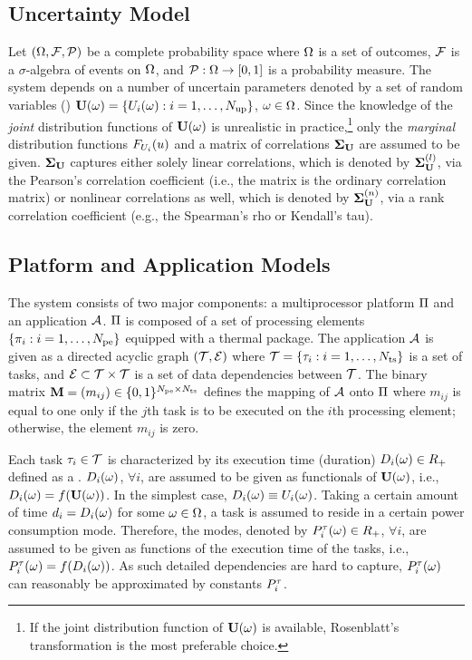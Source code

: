 \subsection{Uncertainty Model} 
Let $(\Omega, \mathcal{F}, \mathcal{P})$ be a complete probability space where $\Omega$ is a set of outcomes, $\mathcal{F}$ is a $\sigma$-algebra of events on $\Omega$, and $\mathcal{P}: \Omega \to [0, 1]$ is a probability measure. The system depends on a number of uncertain parameters denoted by a set of random variables (\rvs) $\mathbf{U}(\omega) = \{ U_i(\omega): i = 1, \dots, {N_\text{up}} \}$, $\omega \in \Omega$. Since the knowledge of the \emph{joint} distribution functions of $\mathbf{U}(\omega)$ is unrealistic in practice,\footnote{If the joint distribution function of $\mathbf{U}(\omega)$ is available, Rosenblatt's transformation is the most preferable choice.} only the \emph{marginal} distribution functions $F_{U_i}(u)$ and a matrix of correlations $\mathbf{\Sigma}_{\mathbf{U}}$ are assumed to be given. $\mathbf{\Sigma}_{\mathbf{U}}$ captures either solely linear correlations, which is denoted by $\mathbf{\Sigma}^{(l)}_{\mathbf{U}}$, via the Pearson's correlation coefficient (i.e., the matrix is the ordinary correlation matrix) or nonlinear correlations as well, which is denoted by $\mathbf{\Sigma}^{(n)}_{\mathbf{U}}$, via a rank correlation coefficient (e.g., the Spearman's rho or Kendall's tau).

\subsection{Platform and Application Models}  
The system consists of two major components: a multiprocessor platform $\Pi$ and an application $\mathcal{A}$. $\Pi$ is composed of a set of processing elements $\{ \pi_i: i = 1, \dots, {N_\text{pe}} \}$ equipped with a thermal package. The application $\mathcal{A}$ is given as a directed acyclic graph $(\mathcal{T}, \mathcal{E})$ where $\mathcal{T} = \{ \tau_i: i = 1, \dots, {N_\text{ts}} \}$ is a set of tasks, and $\mathcal{E} \subset \mathcal{T} \times \mathcal{T}$ is a set of data dependencies between $\mathcal{T}$. The binary matrix $\mathbf{M} = (m_{ij}) \in \{ 0, 1 \}^{{N_\text{pe}} \times {N_\text{ts}}}$ defines the mapping of $\mathcal{A}$ onto $\Pi$ where $m_{ij}$ is equal to one only if the $j$th task is to be executed on the $i$th processing element; otherwise, the element $m_{ij}$ is zero.

Each task $\tau_i \in \mathcal{T}$ is characterized by its execution time (duration) $D_i(\omega) \in R_+$ defined as a \rv. $D_i(\omega)$, $\forall i$, are assumed to be given as functionals of $\mathbf{U}(\omega)$, i.e., $D_i(\omega) = f(\mathbf{U}(\omega))$. In the simplest case, $D_i(\omega) \equiv U_i(\omega)$. Taking a certain amount of time $d_i = D_i(\omega)$ for some $\omega \in \Omega$, a task is assumed to reside in a certain power consumption mode. Therefore, the modes, denoted by $P^\tau_i(\omega) \in R_+$, $\forall i$, are assumed to be given as functions of the execution time of the tasks, i.e., $P^\tau_i(\omega) = f(D_i(\omega))$. As such detailed dependencies are hard to capture, $P^\tau_i(\omega)$ can reasonably be approximated by constants $P^\tau_i$.
